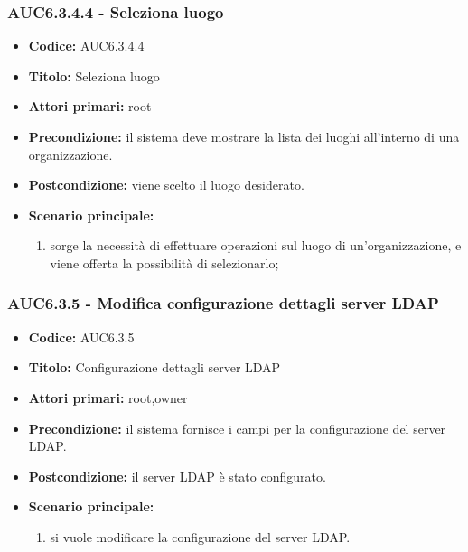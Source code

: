 \documentclass[casi-duso]{subfiles}
\begin{document}
\subsubsection{AUC6.3.4.4 - Seleziona luogo}%
\label{subsub:AUC6.3.4.4}
\begin{itemize}
  \item \textbf{Codice:} AUC6.3.4.4
  \item \textbf{Titolo:} Seleziona luogo
  \item \textbf{Attori primari:} root
  \item \textbf{Precondizione:} il sistema deve mostrare la lista dei luoghi all'interno di una organizzazione.
  \item \textbf{Postcondizione:} viene scelto il luogo desiderato.
  \item \textbf{Scenario principale:}
  \begin{enumerate}
    \item sorge la necessità di effettuare operazioni sul luogo di un'organizzazione, e viene offerta la possibilità di selezionarlo;
  \end{enumerate}
\end{itemize}

\subsubsection{AUC6.3.5 - Modifica configurazione dettagli server LDAP}%
  \label{subsub:AUC6.3.5}
  \begin{itemize}
    \item \textbf{Codice:} AUC6.3.5
    \item \textbf{Titolo:} Configurazione dettagli server LDAP
    \item \textbf{Attori primari:} root,owner
    \item \textbf{Precondizione:} il sistema fornisce i campi per la configurazione del server LDAP.
    \item \textbf{Postcondizione:} il server LDAP è stato configurato.
    \item \textbf{Scenario principale:}
    \begin{enumerate}
      \item si vuole modificare la configurazione del server LDAP.
    \end{enumerate}
  \end{itemize}
\end{document}
